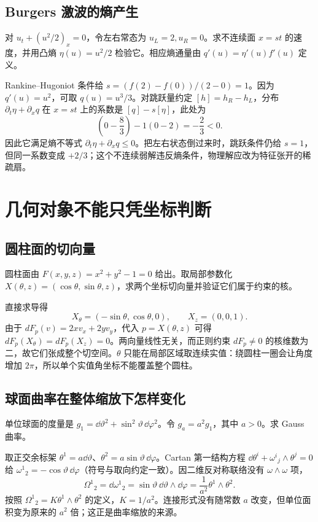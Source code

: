 \subsection*{Burgers 激波的熵产生}
对 \(u_t+(u^2/2)_x=0\)，令左右常态为 \(u_L=2,u_R=0\)。求不连续面 \(x=st\) 的速度，并用凸熵 \(\eta(u)=u^2/2\) 检验它。相应熵通量由 \(q'(u)=\eta'(u)f'(u)\) 定义。

Rankine--Hugoniot 条件给 \(s=(f(2)-f(0))/(2-0)=1\)。因为 \(q'(u)=u^2\)，可取 \(q(u)=u^3/3\)。对跳跃量约定 \([h]=h_R-h_L\)，分布 \(\partial_t\eta+\partial_xq\) 在 \(x=st\) 上的系数是 \([q]-s[\eta]\)，此处为
\[
\left(0-\frac83\right)-1(0-2)=-\frac23<0.
\]
因此它满足熵不等式 \(\partial_t\eta+\partial_xq\le0\)。把左右状态倒过来时，跳跃条件仍给 \(s=1\)，但同一系数变成 \(+2/3\)；这个不连续弱解违反熵条件，物理解应改为特征张开的稀疏扇。

\section{几何对象不能只凭坐标判断}

\subsection*{圆柱面的切向量}
圆柱面由 \(F(x,y,z)=x^2+y^2-1=0\) 给出。取局部参数化 \(X(\theta,z)=(\cos\theta,\sin\theta,z)\)，求两个坐标切向量并验证它们属于约束的核。

直接求导得
\[
X_\theta=(-\sin\theta,\cos\theta,0),\qquad X_z=(0,0,1).
\]
由于 \(dF_p(v)=2xv_x+2yv_y\)，代入 \(p=X(\theta,z)\) 可得 \(dF_p(X_\theta)=dF_p(X_z)=0\)。两向量线性无关，而正则约束 \(dF_p\ne0\) 的核维数为二，故它们张成整个切空间。\(\theta\) 只能在局部区域取连续实值：绕圆柱一圈会让角度增加 \(2\pi\)，所以单个实值角坐标不能覆盖整个圆柱。

\subsection*{球面曲率在整体缩放下怎样变化}
单位球面的度量是 \(g_1=\dd\vartheta^2+\sin^2\vartheta\,\dd\varphi^2\)。令 \(g_a=a^2g_1\)，其中 \(a>0\)。求 Gauss 曲率。

取正交余标架 \(\theta^1=a\dd\vartheta\)、\(\theta^2=a\sin\vartheta\,\dd\varphi\)。Cartan 第一结构方程 \(\dd\theta^i+\omega^i{}_j\wedge\theta^j=0\) 给 \(\omega^1{}_2=-\cos\vartheta\,\dd\varphi\)（符号与取向约定一致）。因二维反对称联络没有 \(\omega\wedge\omega\) 项，
\[
\Omega^1{}_2=\dd\omega^1{}_2
=\sin\vartheta\,\dd\vartheta\wedge\dd\varphi
=\frac1{a^2}\theta^1\wedge\theta^2.
\]
按照 \(\Omega^1{}_2=K\theta^1\wedge\theta^2\) 的定义，\(K=1/a^2\)。连接形式没有随常数 \(a\) 改变，但单位面积变为原来的 \(a^2\) 倍；这正是曲率缩放的来源。

